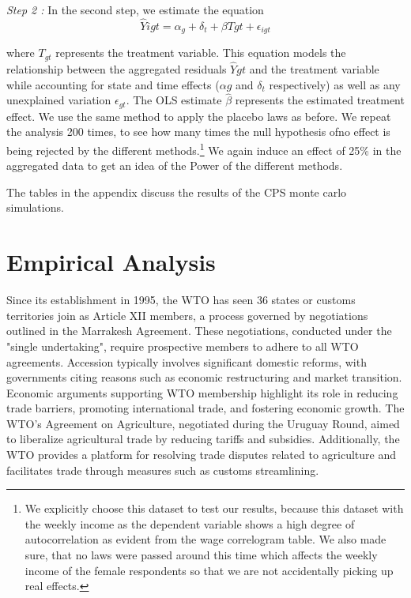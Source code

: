 \documentclass[11pt, a4paper, leqno]{article}
\begin{document}
\textit{Step 2 :}
In the second step, we estimate the equation
\begin{equation}
\hat{Y}{igt} = \alpha_g + \delta_t + \beta T{gt} + \epsilon_{igt}
\end{equation}

\noindent where $T_{gt}$ represents the treatment variable. This equation models the relationship between the aggregated residuals $\hat{Y}{gt}$ and the treatment variable while accounting for state and time effects ($\alpha{g}$ and $\delta_{t}$ respectively) as well as any unexplained variation $\epsilon_{gt}$. The OLS estimate $\hat{\beta}$ represents the estimated treatment effect.
We use the same method to apply the placebo laws as before. We repeat the analysis 200 times, to see how many times the null hypothesis ofno effect is being rejected by the different methods.\footnote{ We explicitly choose this dataset to test our results, because this dataset with the weekly income as the dependent variable shows a high degree of autocorrelation as evident from the wage correlogram table. 
We also made sure, that no laws were passed around this time which affects the weekly income of the female respondents so that we are not accidentally picking up real effects.} We again induce an effect of 25\% in the aggregated data to get an idea of the Power of the different methods.

The tables in the appendix discuss the results of the CPS monte carlo simulations.

\section{Empirical Analysis}
\label{sec: Empirical}

Since its establishment in 1995, the WTO has seen 36 states or customs territories join as Article XII members, a process governed by negotiations outlined in the Marrakesh Agreement. These negotiations, conducted under the "single undertaking", require prospective members to adhere to all WTO agreements. 
Accession typically involves significant domestic reforms, with governments citing reasons such as economic restructuring and market transition. Economic arguments supporting WTO membership highlight its role in reducing trade barriers, promoting international trade, and fostering economic growth. The WTO's Agreement on Agriculture, 
negotiated during the Uruguay Round, aimed to liberalize agricultural trade by reducing tariffs and subsidies. Additionally, the WTO provides a platform for resolving trade disputes related to agriculture and facilitates trade through measures such as customs streamlining. 
\end{document}

